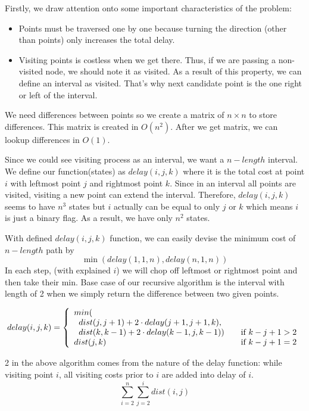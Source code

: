 Firstly, we draw attention onto some important characteristics of the problem:
\begin{itemize}
  \item Points must be traversed one by one because turning the direction (other than points) only increases the total delay.
  \item Visiting points is costless when we get there. Thus, if we are passing a non-visited node, we should note it as visited. As a result of this property, we can define an interval as visited. That's why next candidate point is the one right or left of the interval. 
\end{itemize}

We need differences between points so we create a matrix of $n \times n$ to store differences. This matrix is created in $O(n^2)$. After we get matrix, we can lookup differences in $O(1)$.

Since we could see visiting process as an interval, we want a $n-length$ interval. We define our function(states) as $delay(i, j, k)$ where it is the total cost at point $i$ with leftmost point $j$ and rightmost point $k$. Since in an interval all points are visited, visiting a new point can extend the interval. Therefore, $delay(i, j, k)$ seems to have $n^3$ states but $i$ actually can be equal to only $j$ or $k$ which means $i$ is just a binary flag. As a result, we have only $n^2$ states.

With defined $delay(i, j, k)$ function, we can easily devise the minimum cost of $n-length$ path by
$$
  \min(delay(1, 1, n), delay(n, 1, n))
$$ 
In each step, (with explained $i$) we will chop off  leftmost or rightmost point and then take their min. Base case of our recursive algorithm is the interval with length of 2 when we simply return the difference between two given points.

$$delay(i, j, k) = \left\{ 
  \begin{array}{l l}
    min( \\ \hspace{.2cm} dist(j, j+1) + 2 \cdot delay(j+1, j+1, k), \\ \hspace{.2cm} dist(k, k-1) + 2 \cdot delay(k-1, j, k-1)) & \quad \text{if } k-j+1 > 2 \\
    dist(j, k) & \quad \text{if } k-j+1 = 2
  \end{array} \right.
$$

2 in the above algorithm comes from the nature of the delay function: while visiting point $i$, all visiting costs prior to $i$ are added into delay of $i$.
$$
  \sum_{i=2}^{n}{\sum_{j=2}^{i}{dist(i, j)}}
$$

